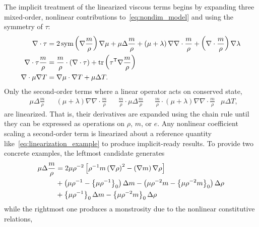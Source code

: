 The implicit treatment of the linearized viscous terms begins by expanding
three mixed-order, nonlinear contributions to~\eqref{eq:nondim_model} and
using the symmetry of $\tau$:
\begin{align}
\label{eq:nabla_cdot_tau_expansion}
  \nabla\cdot\tau
  &=
    2 \operatorname{sym}\left(\nabla\frac{m}{\rho}\right)\nabla\mu
  + \mu \Delta\frac{m}{\rho}
  + \left(\mu+\lambda\right)\nabla\nabla\cdot\frac{m}{\rho}
  + \left(\nabla\cdot\frac{m}{\rho}\right)\nabla\lambda
\\
\label{eq:nabla_cdot_tau_u_expansion}
  \nabla\cdot\tau{}\frac{m}{\rho}
  &=
    \frac{m}{\rho}\cdot\left(\nabla\cdot\tau\right)
  + \operatorname{tr}\left( {\tau}^{\mathsf{T}}\nabla\frac{m}{\rho} \right)
\\
  \nabla\cdot\mu\nabla{}T \label{eq:mu_delta_T}
  &=
    \nabla\mu\cdot\nabla{}T
  + \mu \Delta{}T.
\end{align}
Only the second-order terms where a linear operator acts on conserved state,
\begin{align*}
&\mu\Delta\frac{m}{\rho}
&
&\left(\mu+\lambda\right)\nabla\nabla\cdot\frac{m}{\rho}
&
&\frac{m}{\rho}\cdot\mu\Delta\frac{m}{\rho}
&
&\frac{m}{\rho}\cdot\left(\mu+\lambda\right)\nabla\nabla\cdot\frac{m}{\rho}
&
\mu\Delta{}T,
\end{align*}
are linearized.  That is, their derivatives are expanded using the chain rule until they can
be expressed as operations on $\rho$, $m$, or $e$.  Any nonlinear coefficient
scaling a second-order term is linearized about a reference quantity
like~\eqref{eq:linearization_example} to produce implicit-ready results.  To
provide two concrete examples, the leftmost candidate generates
\begin{align}
\label{eq:linearready_delta_u}
\mu\Delta\frac{m}{\rho} &=
    2\mu\rho^{-2}\left[
          \rho^{-1}m\left(\nabla\rho\right)^{2}
        - \left(\nabla{}m\right)\nabla\rho
    \right]
\notag\\
  &{}+ \left({\mu\rho^{-1}}-\left\{\mu\rho^{-1}\right\}_{0}\right) \Delta{}m
     - \left({\mu\rho^{-2}m}-\left\{\mu\rho^{-2}m\right\}_{0}\right) \Delta\rho
\notag\\
  &{}+ \left\{\mu\rho^{-1}\right\}_{0} \Delta{}m
     - \left\{\mu\rho^{-2}m\right\}_{0} \Delta\rho
\end{align}
while the rightmost one produces a monstrosity due to the
nonlinear constitutive relations,
